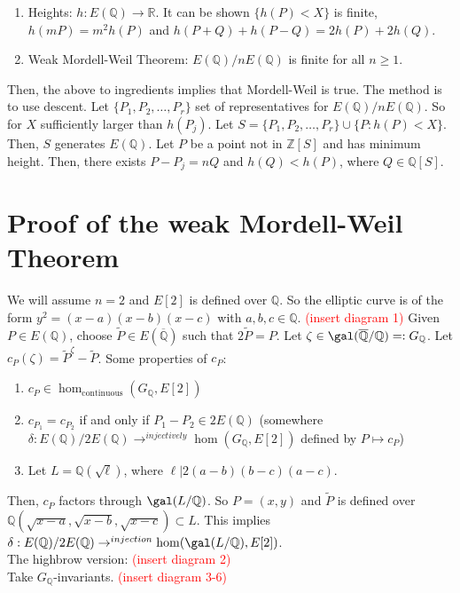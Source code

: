\begin{enumerate}[\upshape (a)]
\item Heights:  $h:E(\mathbb{Q}) \to \mathbb{R}$.  It can be shown $\{h(P) < X\}$ is finite, $h(mP)=m^{2}h(P)$ and $h(P+Q)+h(P-Q)=2h(P)+2h(Q)$.
\item Weak Mordell-Weil Theorem:  $E(\mathbb{Q})/nE(\mathbb{Q})$ is finite for all $n \ge 1$.
\end{enumerate}
Then, the above to ingredients implies that Mordell-Weil is true.  The method is to use descent.  Let $\{P_{1},P_{2},\dotsc,P_{r}\}$ set of representatives for $E(\mathbb{Q})/nE(\mathbb{Q})$.  So for $X$ sufficiently larger than $h(P_{j})$.  Let $S=\{P_{1},P_{2},\dotsc,P_{r}\} \cup \{P: h(P) < X\}$.  Then, $S$ generates $E(\mathbb{Q})$.  Let $P$ be a point not in $\mathbb{Z}[S]$ and has minimum height.  Then, there exists $P-P_{j}=nQ$ and $h(Q) < h(P)$, where $Q \in \mathbb{Q}[S]$.

\section{Proof of the weak Mordell-Weil Theorem}

We will assume $n=2$ and $E[2]$ is defined over $\mathbb{Q}$.  So the elliptic curve is of the form $y^{2}=(x-a)(x-b)(x-c)$ with $a,b,c \in \mathbb{Q}$.  \textcolor{red}{(insert diagram 1)}  Given $P \in E(\mathbb{Q})$, choose $\tilde{P} \in E(\overline{\mathbb{Q}})$ such that $2\tilde{P}=P$.  Let $\zeta \in \gal(\overline{\mathbb{Q}}/\mathbb{Q})=:G_{\mathbb{Q}}$.  Let $c_{P}(\zeta)=\tilde{P}^{\zeta}-\tilde{P}$.  Some properties of $c_{P}$:
\begin{enumerate}[\upshape (1)]
\item $c_{P} \in \hom_{\text{continuous}} (G_{\mathbb{Q}}, E[2])$
\item $c_{P_{1}}=c_{P_{2}}$ if and only if $P_{1}-P_{2} \in 2E(\mathbb{Q})$ (somewhere $\delta:E(\mathbb{Q})/2E(\mathbb{Q}) \to^{injectively} \hom(G_{\mathbb{Q}}, E[2])$ defined by $P \mapsto c_{P}$)
\item Let $L=\mathbb{Q}(\sqrt{\ell})$, where $\ell|2(a-b)(b-c)(a-c)$.
\end{enumerate}
Then, $c_{P}$ factors through $\gal(L/\mathbb{Q})$.  So $P=(x,y)$ and $\tilde{P}$ is defined over $\mathbb{Q}(\sqrt{x-a},\sqrt{x-b},\sqrt{x-c}) \subset L$.  This implies $\delta: E(\mathbb{Q})/2E(\mathbb{Q}) \to^{injection} \hom(\gal(L/\mathbb{Q}),E[2])$.\\
\indent The highbrow version:  \textcolor{red}{(insert diagram 2)}\\
\indent Take $G_{\mathbb{Q}}$-invariants.  \textcolor{red}{(insert diagram 3-6)}


